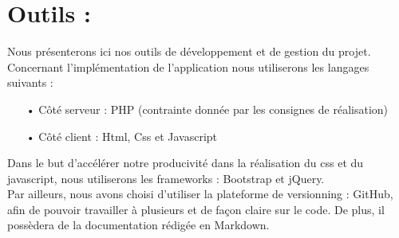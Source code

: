 \section{Outils :}

Nous présenterons ici nos outils de développement et de gestion du projet. Concernant l'implémentation de l'application nous utiliserons les langages suivants :\\
\begin{enumerate}
\item[•] Côté serveur : PHP (contrainte donnée par les consignes de réalisation)
\item[•] Côté client : Html, Css et Javascript
\end{enumerate}
Dans le but d'accélérer notre producivité dans la réalisation du css et du javascript, nous utiliserons les frameworks : Bootstrap et jQuery.\\

Par ailleurs, nous avons choisi d'utiliser la plateforme de versionning : GitHub, afin de pouvoir travailler à plusieurs et de façon claire sur le code. De plus, il possèdera de la documentation rédigée en Markdown.